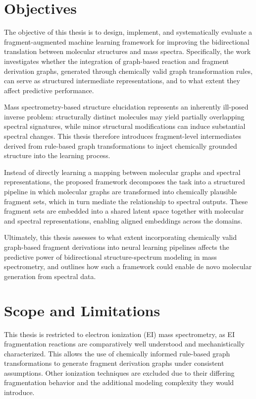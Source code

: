 \section{Objectives}
The objective of this thesis is to design, implement, 
and systematically evaluate a fragment-augmented machine learning framework 
for improving the bidirectional translation 
between molecular structures and mass spectra. 
Specifically, the work investigates whether the integration of graph-based reaction
and fragment derivation graphs, generated through chemically valid graph transformation rules,
can serve as structured intermediate representations,
and to what extent they affect predictive performance.

Mass spectrometry-based structure elucidation represents an inherently ill-posed inverse problem: 
structurally distinct molecules may yield partially overlapping spectral signatures, 
while minor structural modifications can induce substantial spectral changes. 
This thesis therefore introduces fragment-level intermediates derived from rule-based graph transformations 
to inject chemically grounded structure into the learning process.

Instead of directly learning a mapping between molecular graphs and spectral representations, 
the proposed framework decomposes the task into a structured pipeline in which molecular graphs 
are transformed into chemically plausible fragment sets, which in turn mediate the relationship to spectral outputs.
These fragment sets are embedded into a shared latent space together with molecular and spectral representations, 
enabling aligned embeddings across the domains.

Ultimately, this thesis assesses to what extent incorporating chemically
valid graph-based fragment derivations into neural learning pipelines
affects the predictive power
of bidirectional structure-spectrum modeling in mass spectrometry,
and outlines how such a framework could enable de novo molecular generation from spectral data.


\section{Scope and Limitations}

This thesis is restricted to electron ionization (EI) mass spectrometry, 
as EI fragmentation reactions are comparatively 
well understood and mechanistically characterized. \cite[ch.~4\&~8]{McLafferty1993}
This allows the use of chemically informed rule-based graph transformations 
to generate fragment derivation graphs under consistent assumptions. 
Other ionization techniques are excluded due to 
their differing fragmentation behavior 
and the additional modeling complexity they would introduce.

